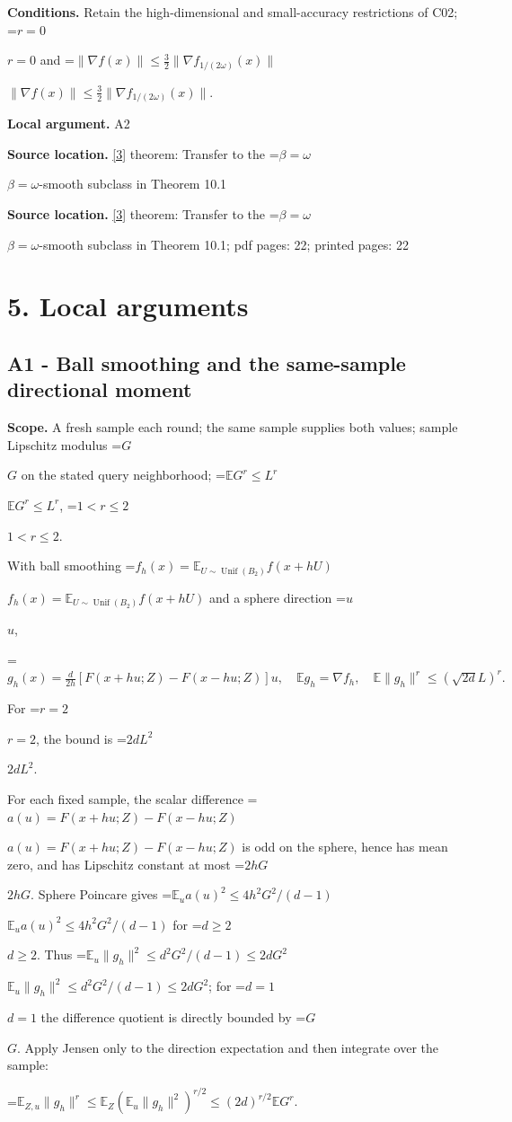 \documentclass[10pt,a4paper]{article}
\newcommand{\AtlasMath}[1]{\par\begingroup\centering\setbox0=\hbox{$\displaystyle #1$}\ifdim\wd0>1.4\linewidth\typeout{ATLAS WIDE FORMULA: \the\wd0}\fi\ifdim\wd0>\linewidth\resizebox{\linewidth}{!}{\box0}\else\box0\fi\par\endgroup}
\newcommand{\AtlasInlineMath}[1]{\begingroup\setbox0=\hbox{$#1$}\ifdim\wd0>.4\linewidth\endgroup\AtlasMath{#1}\else\endgroup$#1$\fi}
\begin{document}
\textbf{Conditions.} Retain the high-dimensional and small-accuracy restrictions of C02; \AtlasInlineMath{r=0} and \AtlasInlineMath{\|\nabla f(x)\|\le\tfrac32\|\nabla f_{1/(2\omega)}(x)\|}.

\textbf{Local argument.} A2

\textbf{Source location.} \href{https://arxiv.org/html/2610.19652v1}{[3]} theorem: Transfer to the \AtlasInlineMath{\beta =\omega}-smooth subclass in Theorem 10.1

\textbf{Source location.} \href{https://arxiv.org/html/2610.19652v1}{[3]} theorem: Transfer to the \AtlasInlineMath{\beta =\omega}-smooth subclass in Theorem 10.1; pdf pages: 22; printed pages: 22

\section{5. Local arguments}
\subsection{A1 - Ball smoothing and the same-sample directional moment}
\textbf{Scope.} A fresh sample each round; the same sample supplies both values; sample Lipschitz modulus \AtlasInlineMath{G} on the stated query neighborhood; \AtlasInlineMath{\mathbb E G^r\le L^r}, \AtlasInlineMath{1<r\le2}.

With ball smoothing \AtlasInlineMath{f_h(x)=\mathbb E_{U\sim\operatorname{Unif}(B_2)}f(x+hU)} and a sphere direction \AtlasInlineMath{u},

\AtlasMath{g_h(x)=\frac d{2h}[F(x+hu;Z)-F(x-hu;Z)]u,\quad\mathbb E g_h=\nabla f_h,\quad\mathbb E\|g_h\|^r\le(\sqrt{2d}L)^r.}

For \AtlasInlineMath{r=2}, the bound is \AtlasInlineMath{2dL^2}.

For each fixed sample, the scalar difference \AtlasInlineMath{a(u)=F(x+hu;Z)-F(x-hu;Z)} is odd on the sphere, hence has mean zero, and has Lipschitz constant at most \AtlasInlineMath{2hG}. Sphere Poincare gives \AtlasInlineMath{\mathbb E_u a(u)^2\le4h^2G^2/(d-1)} for \AtlasInlineMath{d\ge2}. Thus \AtlasInlineMath{\mathbb E_u\|g_h\|^2\le d^2G^2/(d-1)\le2dG^2}; for \AtlasInlineMath{d=1} the difference quotient is directly bounded by \AtlasInlineMath{G}. Apply Jensen only to the direction expectation and then integrate over the sample:

\AtlasMath{\mathbb E_{Z,u}\|g_h\|^r\le\mathbb E_Z(\mathbb E_u\|g_h\|^2)^{r/2}\le(2d)^{r/2}\mathbb E G^r.}
\end{document}
